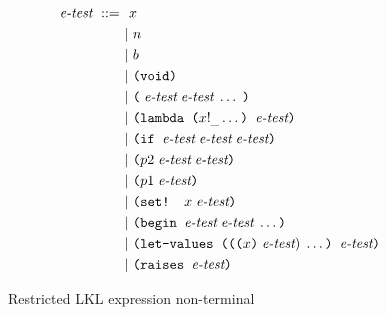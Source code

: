 \begin{figure}[!h]
    \centering
    \begin{align*}
      \textit{e\text{-}test}~::=~&~x \\
      &|~n \\
      &|~b \\
      &|~\texttt{(void)} \\
      &|~\texttt{(}\;\textit{e\text{-}test}\;\textit{e\text{-}test}\;\ldots\;\texttt{)} \\
      &|~\texttt{(lambda (}x!_{\_}\ldots\texttt{) }\textit{e\text{-}test}\texttt{)} \\
      &|~\texttt{(if }\textit{e\text{-}test}\;\textit{e\text{-}test}\;\textit{e\text{-}test}\texttt{)} \\
      &|~\texttt{(}p2\;\textit{e\text{-}test}\;\textit{e\text{-}test}\texttt{)} \\
      &|~\texttt{(}p1\;\textit{e\text{-}test}\texttt{)} \\
      &|~\texttt{(set! }x\;\textit{e\text{-}test}\texttt{)} \\
      &|~\texttt{(begin }\textit{e\text{-}test}\;\textit{e\text{-}test}\;\ldots\texttt{)} \\
      &|~\texttt{(let-values (((}x\texttt{)}\;\textit{e\text{-}test})\;\ldots\texttt{) }\textit{e\text{-}test}\texttt{)} \\
      &|~\texttt{(raises }\textit{e\text{-}test}\texttt{)}
    \end{align*}
    \caption{Restricted LKL expression non-terminal}
    \label{fig:restricted-lkl-expression}
\end{figure}
